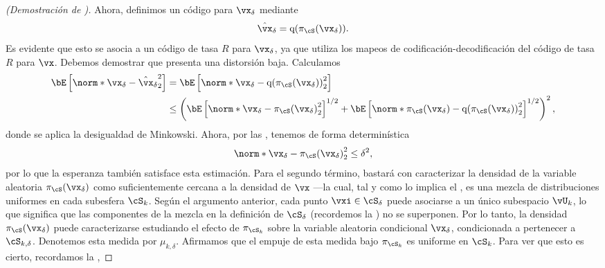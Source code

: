\documentclass[../../book-main_es.tex]{subfiles}
\begin{document}
\begin{proof}[(Demostración de )]
    Ahora, definimos un código para $\vx_{\delta}$ mediante
    \begin{equation}
        \hat{\vx}_{\delta} = \mathrm{q}( \pi_{\cS}(\vx_{\delta}) ).
    \end{equation}
    Es evidente que esto se asocia a un código de tasa $R$ para $\vx_{\delta}$, ya que
    utiliza los mapeos de codificación-decodificación del código de tasa $R$ para $\vx$. Debemos
    demostrar que presenta una distorsión baja.
    Calculamos
    \begin{align}
        \bE\left[ \norm*{ \vx_{\delta} - \hat{\vx}_{\delta} }_2^2 \right]
        &=
        \bE\left[ \norm*{ \vx_{\delta} -
        \mathrm{q}(\pi_{\cS}(\vx_{\delta})) }_2^2 \right]
        \\
        &\leq
        \left(
            \bE\left[ \norm*{ \vx_{\delta} - \pi_{\cS}(\vx_{\delta}) }_2^2
            \right]^{1/2}
            + \bE\left[ \norm*{ \pi_{\cS}(\vx_{\delta})
            - \mathrm{q}(\pi_{\cS}(\vx_{\delta})) }_2^2 \right]^{1/2}
        \right)^2,\label{eq:distortion-decomposition}
    \end{align}
    donde se aplica la desigualdad de Minkowski.
    Ahora, por las , tenemos
    de forma determinística
    \begin{equation}
        \norm*{ \vx_{\delta} - \pi_{\cS}(\vx_{\delta}) }_2^2
        \leq \delta^2,
    \end{equation}
    por lo que la esperanza también satisface esta estimación.
    Para el segundo término, bastará con caracterizar la densidad de la
    variable aleatoria $\pi_{\cS}(\vx_{\delta})$ como suficientemente cercana a la
    densidad de $\vx$ —la cual, tal y como lo implica el , es
    una mezcla de distribuciones uniformes en cada subesfera $\cS_k$.
    Según el argumento anterior, cada punto $\vxi \in \cS_{\delta}$ puede asociarse
    a un único subespacio $\vU_k$, lo que significa que las componentes de la mezcla
    en la definición de $\cS_{\delta}$ (recordemos la
    ) no se superponen. Por lo tanto, la densidad
    $\pi_{\cS}(\vx_{\delta})$ puede caracterizarse estudiando el efecto de
    $\pi_{\cS_k}$ sobre la variable aleatoria condicional $\vx_{\delta}$, condicionada
    a pertenecer a $\cS_{k, \delta}$. Denotemos esta medida por $\mu_{k,
    \delta}$.
    Afirmamos que el empuje de esta medida bajo $\pi_{\cS_k}$
    es uniforme en $\cS_k$.
    Para ver que esto es cierto, recordamos la
    ,

\end{proof}
\end{document}
